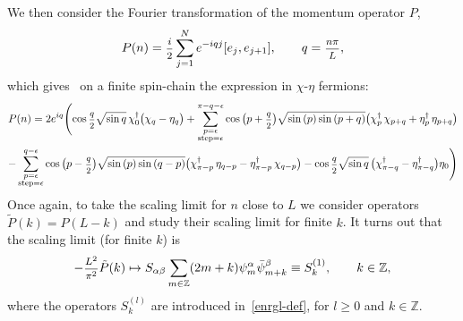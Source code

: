 \documentclass[11pt]{article}
\newcommand{\ffrac}[2]{\mbox{\footnotesize$\displaystyle\frac{#1}{#2}$}}
\newcommand{\sferm}{\psi}
\newcommand{\bsferm}{\bar{\psi}}
\newcommand{\oZ}{\mathbb{Z}}
\newcommand{\step}{\epsilon}
\newcommand{\enrg}{S}
\theoremstyle{definition}
\begin{document}
\medskip

We then consider the Fourier transformation of the momentum operator $P$,
\begin{equation*}
P(n)=\ffrac{i}{2}\sum_{j=1}^N e^{-iqj} [e_j,e_{j+1}], \qquad q=\ffrac{n\pi}{L},
\end{equation*}
which gives~\cite{GRS1} on a finite spin-chain the expression in $\chi$-$\eta$ fermions:
\begin{multline*}
P(n) = 2e^{iq}\Biggl(\cos{\ffrac{q}{2}}\sqrt{\sin{q}}\, \chi^{\dagger}_{0}\bigl(\chi_{q} -
\eta_{q}\bigr) + \sum_{\substack{p=\step\\\text{step}=\step}}^{\pi-q-\step}
\cos{\bigl(p+\ffrac{q}{2}\bigr)}\sqrt{\sin{(p)}\sin{(p+q)}} \bigl(\chi^{\dagger}_{p}\,\chi_{p+q} +
\eta^{\dagger}_{p}\,\eta_{p+q}\bigr)\\
- \sum_{\substack{p=\step\\\text{step}=\step}}^{q-\step}
\cos{\bigl(p-\ffrac{q}{2}\bigr)}\sqrt{\sin{(p)}\sin{(q-p)}}\bigl(\chi^{\dagger}_{\pi-p}\,\eta_{q-p} -
\eta^{\dagger}_{\pi-p}\,\chi_{q-p}\bigr)
- \cos{\ffrac{q}{2}}\sqrt{\sin{q}}\, \bigl(\chi^{\dagger}_{\pi-q} -
\eta^{\dagger}_{\pi-q}\bigr)\eta_{0}\Biggr)
\end{multline*}
Once again,  to take the scaling limit for $n$ close to $L$ we  consider operators $\tilde{P}(k)=P(L-k)$ and study their scaling limit for finite $k$.  It turns out that  the scaling limit (for finite $k$) is
\begin{equation}
-\ffrac{L^2}{\pi^2}\tilde{P}(k) \mapsto S_{\alpha
 \beta}\sum_{m\in\oZ}(2m+k)\sferm^{\alpha}_{m}\bsferm^{\beta}_{m+k}\equiv
 \enrg^{(1)}_k,\qquad k\in\oZ,
\end{equation}
where the operators $\enrg^{(l)}_k$ are introduced in~\eqref{enrgl-def}, for $l\geq 0$ and $k\in\oZ$.
\end{document}
